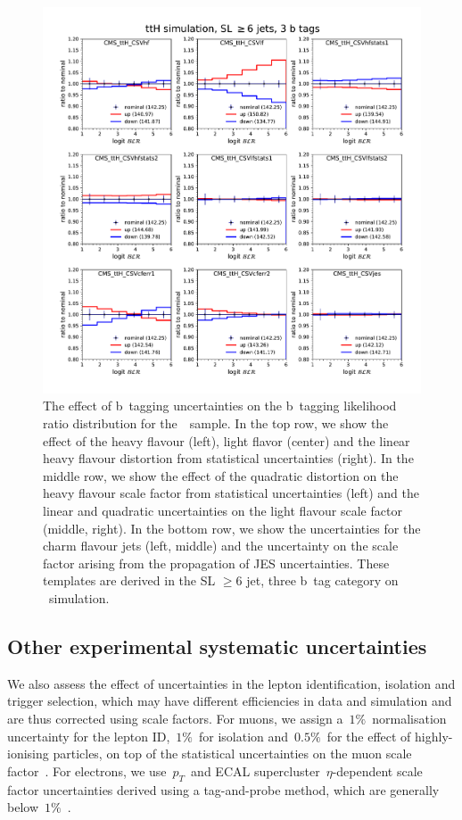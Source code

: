 \begin{figure}
\begin{centering}
\includegraphics[width = 1.0\textwidth]{figures/tth/sl_jge6_t3_blr_unc.pdf}
\caption[The effect of b~tagging uncertainties on the b~tagging likelihood ratio.]{The effect of b~tagging uncertainties on the b~tagging likelihood ratio distribution for the~\ttHbb~sample. In the top row, we show the effect of the heavy flavour (left), light flavor (center) and the linear heavy flavour distortion from statistical uncertainties (right). In the middle row, we show the effect of the quadratic distortion on the heavy flavour scale factor from statistical uncertainties (left) and the linear and quadratic uncertainties on the light flavour scale factor (middle, right). In the bottom row, we show the uncertainties for the charm flavour jets (left, middle) and the uncertainty on the scale factor arising from the propagation of JES uncertainties. These templates are derived in the SL $\geq6$ jet, three b~tag category on \ttH~simulation.}
\label{fig:tth_btag_unc}
\end{centering}
\end{figure}

\subsection{Other experimental systematic uncertainties}
We also assess the effect of uncertainties in the lepton identification, isolation and trigger selection, which may have different efficiencies in data and simulation and are thus corrected using scale factors. For muons, we assign a~$1\%$~normalisation uncertainty for the lepton ID,~$1\%$~for isolation and~$0.5\%$~for the effect of highly-ionising particles, on top of the statistical uncertainties on the muon scale factor~\cite{CMS:2017_mu_sf}. For electrons, we use~$p_T$~and ECAL supercluster~$\eta$-dependent scale factor uncertainties derived using a tag-and-probe method, which are generally below~$1\%$~\cite{CMS:2017_ele_sf}.

